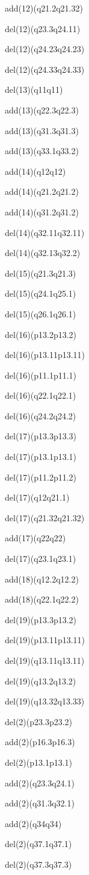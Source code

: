 \documentclass[]{article}
\begin{document}
add(12)(q21.2q21.32)

del(12)(q23.3q24.11)

del(12)(q24.23q24.23)

del(12)(q24.33q24.33)

del(13)(q11q11)

add(13)(q22.3q22.3)

add(13)(q31.3q31.3)

add(13)(q33.1q33.2)

add(14)(q12q12)

add(14)(q21.2q21.2)

add(14)(q31.2q31.2)

del(14)(q32.11q32.11)

del(14)(q32.13q32.2)

del(15)(q21.3q21.3)

del(15)(q24.1q25.1)

del(15)(q26.1q26.1)

del(16)(p13.2p13.2)

del(16)(p13.11p13.11)

del(16)(p11.1p11.1)

del(16)(q22.1q22.1)

del(16)(q24.2q24.2)

del(17)(p13.3p13.3)

del(17)(p13.1p13.1)

del(17)(p11.2p11.2)

del(17)(q12q21.1)

del(17)(q21.32q21.32)

add(17)(q22q22)

del(17)(q23.1q23.1)

add(18)(q12.2q12.2)

add(18)(q22.1q22.2)

del(19)(p13.3p13.2)

del(19)(p13.11p13.11)

del(19)(q13.11q13.11)

del(19)(q13.2q13.2)

del(19)(q13.32q13.33)

del(2)(p23.3p23.2)

add(2)(p16.3p16.3)

del(2)(p13.1p13.1)

add(2)(q23.3q24.1)

add(2)(q31.3q32.1)

add(2)(q34q34)

del(2)(q37.1q37.1)

del(2)(q37.3q37.3)
\end{document}
